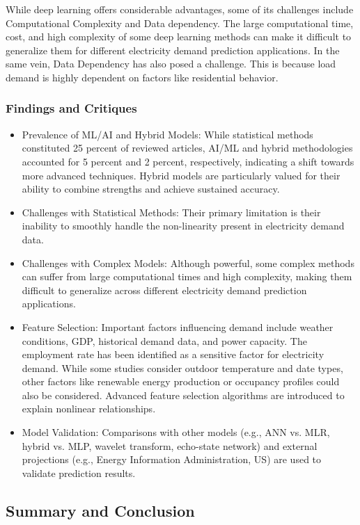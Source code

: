 \documentclass[conference]{IEEEtran}
\begin{document}
While deep learning offers considerable advantages, some of its challenges include Computational Complexity and Data dependency. The large computational time, cost, and high complexity of some deep learning methods can make it difficult to generalize them for different electricity demand prediction applications. In the same vein, Data Dependency has also posed a challenge. This is because load demand is highly dependent on factors like residential behavior.


 \subsubsection{Findings and Critiques} 
 \begin{itemize}
     \item Prevalence of ML/AI and Hybrid Models: While statistical methods constituted 25 percent of reviewed articles, AI/ML and hybrid methodologies accounted for 5 percent and 2 percent, respectively, indicating a shift towards more advanced techniques. Hybrid models are particularly valued for their ability to combine strengths and achieve sustained accuracy.
     \item Challenges with Statistical Methods: Their primary limitation is their inability to smoothly handle the non-linearity present in electricity demand data.
     \item Challenges with Complex Models: Although powerful, some complex methods can suffer from large computational times and high complexity, making them difficult to generalize across different electricity demand prediction applications.
    \item Feature Selection: Important factors influencing demand include weather conditions, GDP, historical demand data, and power capacity. The employment rate has been identified as a sensitive factor for electricity demand. While some studies consider outdoor temperature and date types, other factors like renewable energy production or occupancy profiles could also be considered. Advanced feature selection algorithms are introduced to explain nonlinear relationships.
    \item Model Validation: Comparisons with other models (e.g., ANN vs. MLR, hybrid vs. MLP, wavelet transform, echo-state network) and external projections (e.g., Energy Information Administration, US) are used to validate prediction results.
\end{itemize}

\subsection{Summary and Conclusion}
\end{document}
